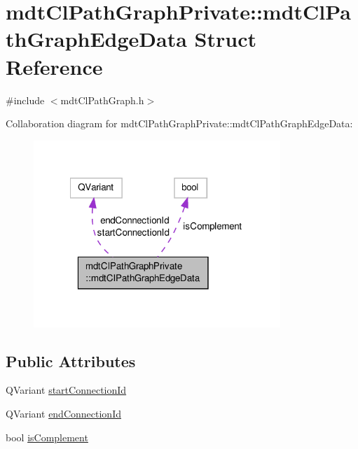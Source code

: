 \hypertarget{structmdt_cl_path_graph_private_1_1mdt_cl_path_graph_edge_data}{\section{mdt\-Cl\-Path\-Graph\-Private\-:\-:mdt\-Cl\-Path\-Graph\-Edge\-Data Struct Reference}
\label{structmdt_cl_path_graph_private_1_1mdt_cl_path_graph_edge_data}
}


{\ttfamily \#include $<$mdt\-Cl\-Path\-Graph.\-h$>$}



Collaboration diagram for mdt\-Cl\-Path\-Graph\-Private\-:\-:mdt\-Cl\-Path\-Graph\-Edge\-Data\-:
\nopagebreak
\begin{figure}[H]
\begin{center}
\leavevmode
\includegraphics[width=264pt]{structmdt_cl_path_graph_private_1_1mdt_cl_path_graph_edge_data__coll__graph}
\end{center}
\end{figure}
\subsection*{Public Attributes}
\begin{DoxyCompactItemize}
\item 
Q\-Variant \hyperlink{structmdt_cl_path_graph_private_1_1mdt_cl_path_graph_edge_data_a4d17d73e0bbc09b541b91a9ca1cad8da}{start\-Connection\-Id}
\item 
Q\-Variant \hyperlink{structmdt_cl_path_graph_private_1_1mdt_cl_path_graph_edge_data_a6dfdd2c68bdec4556ab367517737b7a1}{end\-Connection\-Id}
\item 
bool \hyperlink{structmdt_cl_path_graph_private_1_1mdt_cl_path_graph_edge_data_a423302ffa14fedbb80f362f9f44960d7}{is\-Complement}
\end{DoxyCompactItemize}


